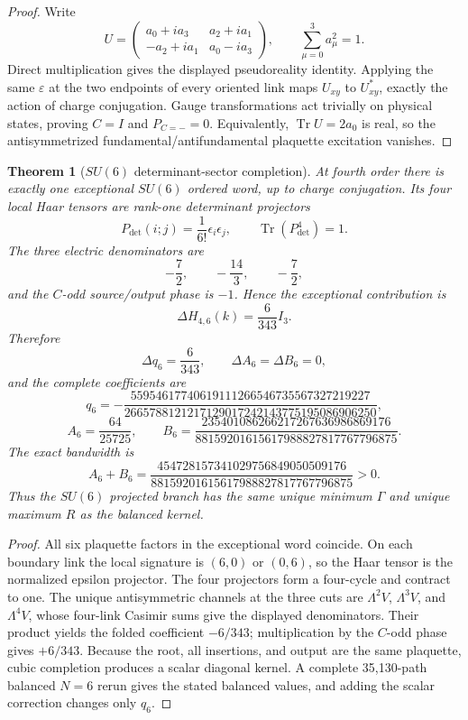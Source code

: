 \documentclass[11pt]{article}
\newtheorem{theorem}{Theorem}[section]
\newcommand{\Tr}{\operatorname{Tr}}
\begin{document}
\begin{proof}
Write
\[
U=\begin{pmatrix}
 a_0+ia_3&a_2+ia_1\\-a_2+ia_1&a_0-ia_3
\end{pmatrix},\qquad \sum_{\mu=0}^3a_\mu^2=1.
\]
Direct multiplication gives the displayed pseudoreality identity. Applying the
same $\varepsilon$ at the two endpoints of every oriented link maps
$U_{xy}$ to $U_{xy}^*$, exactly the action of charge conjugation. Gauge
transformations act trivially on physical states, proving $C=I$ and
$P_{C=-}=0$. Equivalently, $\Tr U=2a_0$ is real, so the antisymmetrized
fundamental/antifundamental plaquette excitation vanishes.
\end{proof}

\begin{theorem}[$SU(6)$ determinant-sector completion]
\label{thm:su6complete}
At fourth order there is exactly one exceptional $SU(6)$ ordered word, up to
charge conjugation. Its four local Haar tensors are rank-one determinant
projectors
\[
P_{\det}(i;j)=\frac1{6!}\epsilon_i\epsilon_j,
\qquad \Tr(P_{\det}^4)=1.
\]
The three electric denominators are
\[
-\frac72,\qquad -\frac{14}{3},\qquad -\frac72,
\]
and the $C$-odd source/output phase is $-1$. Hence the exceptional contribution
is
\[
\boxed{\Delta H_{4,6}(k)=\frac6{343}I_3}.
\]
Therefore
\[
\Delta q_6=\frac6{343},\qquad \Delta A_6=\Delta B_6=0,
\]
and the complete coefficients are
\[
\boxed{q_6=-\frac{55954617740619111266546735567327219227}
{2665788121217129017242143775195086906250}},
\]
\[
\boxed{A_6=\frac{64}{25725}},\qquad
\boxed{B_6=\frac{235401086266217267636986869176}
{88159201615617988827817767796875}}.
\]
The exact bandwidth is
\[
\boxed{A_6+B_6=\frac{454728157341029756849050509176}
{88159201615617988827817767796875}}>0.
\]
Thus the $SU(6)$ projected branch has the same unique minimum $\Gamma$ and
unique maximum $R$ as the balanced kernel.
\end{theorem}

\begin{proof}
All six plaquette factors in the exceptional word coincide. On each boundary
link the local signature is $(6,0)$ or $(0,6)$, so the Haar tensor is the
normalized epsilon projector. The four projectors form a four-cycle and
contract to one. The unique antisymmetric channels at the three cuts are
$\Lambda^2V$, $\Lambda^3V$, and $\Lambda^4V$, whose four-link Casimir sums give
the displayed denominators. Their product yields the folded coefficient
$-6/343$; multiplication by the $C$-odd phase gives $+6/343$. Because the root,
all insertions, and output are the same plaquette, cubic completion produces a
scalar diagonal kernel. A complete 35,130-path balanced $N=6$ rerun gives the
stated balanced values, and adding the scalar correction changes only $q_6$.
\end{proof}
\end{document}
